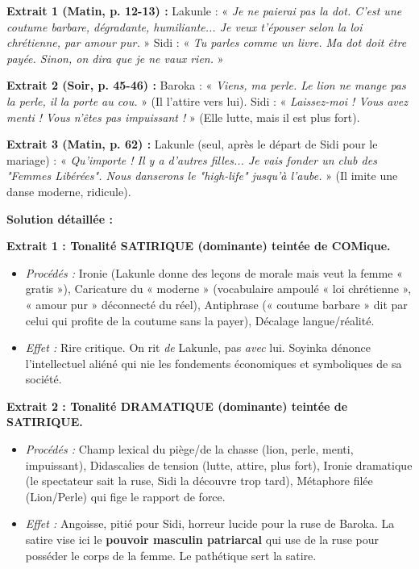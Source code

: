 \documentclass[11pt]{article}
\begin{document}
\begin{exoresolu}
\textbf{Extrait 1 (Matin, p. 12-13) :} Lakunle : « \emph{Je ne paierai pas la dot. C'est une coutume barbare, dégradante, humiliante... Je veux t'épouser selon la loi chrétienne, par amour pur.} » Sidi : « \emph{Tu parles comme un livre. Ma dot doit être payée. Sinon, on dira que je ne vaux rien.} »

\textbf{Extrait 2 (Soir, p. 45-46) :} Baroka : « \emph{Viens, ma perle. Le lion ne mange pas la perle, il la porte au cou.} » (Il l'attire vers lui). Sidi : « \emph{Laissez-moi ! Vous avez menti ! Vous n'êtes pas impuissant !} » (Elle lutte, mais il est plus fort).

\textbf{Extrait 3 (Matin, p. 62) :} Lakunle (seul, après le départ de Sidi pour le mariage) : « \emph{Qu'importe ! Il y a d'autres filles... Je vais fonder un club des "Femmes Libérées". Nous danserons le "high-life" jusqu'à l'aube.} » (Il imite une danse moderne, ridicule).

\tcblower
\textbf{Solution détaillée :}

\textbf{Extrait 1 : Tonalité \textbf{SATIRIQUE} (dominante) teintée de COMique.}
\begin{itemize}
    \item \textit{Procédés :} Ironie (Lakunle donne des leçons de morale mais veut la femme « gratis »), Caricature du « moderne » (vocabulaire ampoulé « loi chrétienne », « amour pur » déconnecté du réel), Antiphrase (« coutume barbare » dit par celui qui profite de la coutume sans la payer), Décalage langue/réalité.
    \item \textit{Effet :} Rire critique. On rit \emph{de} Lakunle, pas \emph{avec} lui. Soyinka dénonce l'intellectuel aliéné qui nie les fondements économiques et symboliques de sa société.
\end{itemize}

\textbf{Extrait 2 : Tonalité \textbf{DRAMATIQUE} (dominante) teintée de SATIRIQUE.}
\begin{itemize}
    \item \textit{Procédés :} Champ lexical du piège/de la chasse (lion, perle, menti, impuissant), Didascalies de tension (lutte, attire, plus fort), Ironie dramatique (le spectateur sait la ruse, Sidi la découvre trop tard), Métaphore filée (Lion/Perle) qui fige le rapport de force.
    \item \textit{Effet :} Angoisse, pitié pour Sidi, horreur lucide pour la ruse de Baroka. La satire vise ici le \textbf{pouvoir masculin patriarcal} qui use de la ruse pour posséder le corps de la femme. Le pathétique sert la satire.
\end{itemize}


\end{exoresolu}
\end{document}
